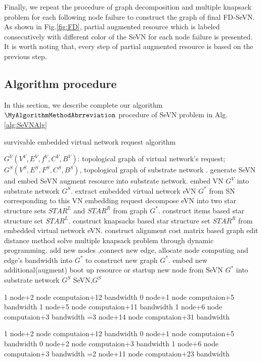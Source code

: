 Finally, we repeat the procedure of graph decomposition and multiple knapsack problem for each following node failure to construct the graph of final FD-SeVN. As shown in Fig.\ref{fig:FD}, partial augmented resource which is labeled consecutively with different color of the SeVN for each node failure is presented. It is worth noting that, every step of partial augmented resource is based on the previous step.

\subsection{Algorithm procedure}
In this section, we describe complete our algorithm $\MyAlgorithmMethodAbrreviation$ procedure of SeVN problem in Alg.\ref{alg:SeVNAlg}
\begin{algorithm}
\label{alg:SeVNAlg}
\caption{survivable embedded virtual network request algorithm}
\begin{algorithmic}[1]
\REQUIRE $G^V (V^V,E^V,f^V,C^V,B^V)$:  topological graph of virtual network's request; $G^S (V^S,E^S,F^S,C^S,B^S)$, topological graph of substrate network .
\ENSURE generate SeVN and embed SeVN augment resource into substrate network.
\STATE embed VN $G^V$ into substrate network $G^S$.
\STATE extract embedded virtual network eVN $G^*$ from SN corresponding to this VN embedding request
\STATE decompose eVN into two star structure sets $STAR^L$ and $STAR^R$ from graph $G^*$.
\STATE construct items based star structure set $STAR^L$.
\STATE construct knapsacks based star structure set $STAR^R$ from embedded virtual network eVN.
\STATE construct alignment cost matrix based graph edit distance method\cite{sanfeliu1983distance}
\STATE solve multiple knapsack problem through dynamic programming.
\STATE add new nodes ,connect new edge, allocate node computing and edge's bandwidth into $G^*$ to construct new graph $G^*$.
\ENDFOR
\STATE embed new additional(augment) boot up resource or startup new node from SeVN $G^*$ into substrate network $G^S$
\RETURN SeVN,$G^S$
\end{algorithmic}
\end{algorithm}

1 node+2 node computaion+12 bandwidth
0 node+1 node computaion+5 bandwidth
1 node+5 node computaion+11 bandwidth
1 node+6 node computaion+3 bandwidth
=3 node+14 node computaion+31 bandwidth

1 node+2 node computaion+12 bandwidth
0 node+1 node computaion+5 bandwidth
0 node+2 node computaion+3 bandwidth
1 node+6 node computaion+3 bandwidth
=2 node+11 node computaion+23 bandwidth
